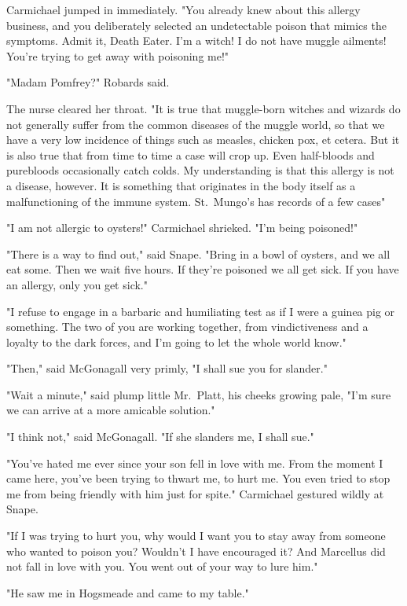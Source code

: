 Carmichael jumped in immediately. "You already knew about this allergy business, and you deliberately selected an undetectable poison that mimics the symptoms. Admit it, Death Eater. I'm a witch! I do not have muggle ailments! You're trying to get away with poisoning me!"

"Madam Pomfrey?" Robards said.

The nurse cleared her throat. "It is true that muggle-born witches and wizards do not generally suffer from the common diseases of the muggle world, so that we have a very low incidence of things such as measles, chicken pox, et cetera. But it is also true that from time to time a case will crop up. Even half-bloods and purebloods occasionally catch colds. My understanding is that this allergy is not a disease, however. It is something that originates in the body itself as a malfunctioning of the immune system. St.~Mungo's has records of a few cases{\el}"

"I am not allergic to oysters!" Carmichael shrieked. "I'm being poisoned!"

"There is a way to find out," said Snape. "Bring in a bowl of oysters, and we all eat some. Then we wait five hours. If they're poisoned we all get sick. If you have an allergy, only you get sick."

"I refuse to engage in a barbaric and humiliating test as if I were a guinea pig or something. The two of you are working together, from vindictiveness and a loyalty to the dark forces, and I'm going to let the whole world know."

"Then," said McGonagall very primly, "I shall sue you for slander."

"Wait a minute," said plump little Mr.~Platt, his cheeks growing pale, "I'm sure we can arrive at a more amicable solution."

"I think not," said McGonagall. "If she slanders me, I shall sue."

"You've hated me ever since your son fell in love with me. From the moment I came here, you've been trying to thwart me, to hurt me. You even tried to stop me from being friendly with him just for spite." Carmichael gestured wildly at Snape.

"If I was trying to hurt you, why would I want you to stay away from someone who wanted to poison you? Wouldn't I have encouraged it? And Marcellus did not fall in love with you. You went out of your way to lure him."

"He saw me in Hogsmeade and came to my table."

